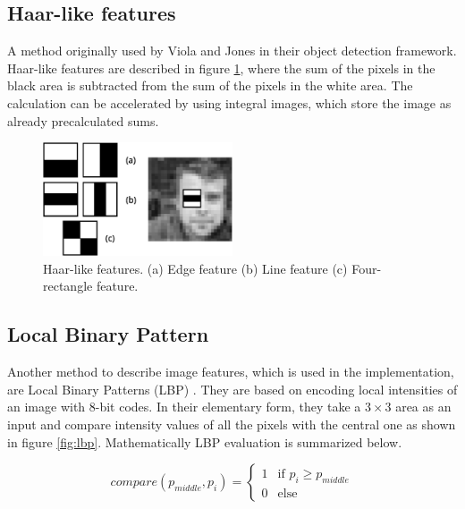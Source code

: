 \subsection{Haar-like features}

A method originally used by Viola and Jones \cite{Viola01rapidobject} in their object detection framework. Haar-like features are described in figure \ref{fig:haar}, where the sum of the pixels in the black area is subtracted from the sum of the pixels in the white area. The calculation can be accelerated by using integral images, which store the image as already precalculated sums.

\begin{center}
\begin{figure}[ht]
	\centering\includegraphics[width=0.5\textwidth]{fig/haar.eps}
	\caption{Haar-like features. (a) Edge feature (b) Line feature (c) Four-rectangle feature.}
	\label{fig:haar}
\end{figure}
\end{center}

\subsection{Local Binary Pattern}

Another method to describe image features, which is used in the implementation, are Local Binary Patterns (LBP) \cite{Ojala02multiresolutiongrayscale}. They are based on encoding local intensities of an image with 8-bit codes. In their elementary form, they take a $3 \times 3$ area as an input and compare intensity values of all the pixels with the central one as shown in figure \ref{fig:lbp}. Mathematically LBP evaluation is summarized below.

\begin{equation}
 compare(p_{middle},p_{i}) =
  \begin{cases}
   1 & \text{if } p_{i} \geq p_{middle} \\
   0 & \text{else}
  \end{cases}
\end{equation}


